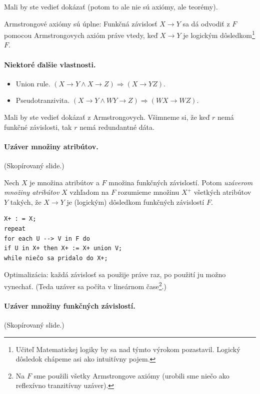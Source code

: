 \documentclass[10pt,a4paper]{article}
\begin{document}
Mali by ste vedieť dokázať (potom to ale nie sú axiómy, ale teorémy).

Armstrongové axiómy sú úplne:
Funkčná závislosť $X \rightarrow Y$ sa dá odvodiť z $F$ pomocou
Armstrongovych axióm práve vtedy, keď $X \rightarrow Y$ je logickým
dôsledkom\footnote{Učiteľ Matematickej logiky by sa nad týmto výrokom pozastavil. Logický dôsledok chápeme asi ako intuitívny pojem.} $F$.


\paragraph{Niektoré ďalšie vlastnosti.}

\begin{itemize}
\item Union rule. $(X \rightarrow Y \wedge X \rightarrow Z) \Rightarrow (X \rightarrow YZ)$.
\item Pseudotranzivita. $(X \rightarrow Y \wedge WY \rightarrow Z) \Rightarrow (WX \rightarrow WZ)$.
\end{itemize}

Mali by ste vedieť dokázať z Armstrongovych.
Všimneme si, že keď $r$ nemá funkčné závislosti, tak $r$ nemá redundantné dáta.

\paragraph{Uzáver množiny atribútov.}
(Skopírovaný slide.)

Nech $X$ je množina atribútov a $F$ množina funkčných
závislostí. Potom \emph{uzáverom množiny atribútov} $X$ vzhľadom na $F$
rozumieme množinu $X^+$ všetkých atribútov $Y$ takých, že $X \rightarrow Y$ je
(logickým) dôsledkom funkčných závislostí $F$.

\begin{verbatim}
X+ : = X;
repeat
for each U --> V in F do
if U in X+ then X+ := X+ union V;
while niečo sa pridalo do X+;
\end{verbatim}

Optimalizácia: každá závislosť sa použije práve raz, po použití ju
možno vynechať. (Teda uzáver sa počíta v lineárnom čase\footnote{
Na $F$ sme použili všetky Armstrongove axiómy (urobili sme niečo ako reflexívno tranzitívny uzáver).
}.)

\paragraph{Uzáver množiny funkčných závislostí.}
(Skopírovaný slide.)
\end{document}
